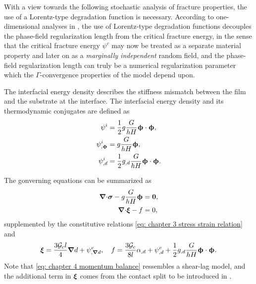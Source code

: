 \begin{remark}
  With a view towards the following stochastic analysis of fracture properties, the use of a Lorentz-type degradation function is necessary. According to one-dimensional analyses in \cite{geelen2019phase,wu2017unified}, the use of Lorentz-type degradation functions decouples the phase-field regularization length from the critical fracture energy, in the sense that the critical fracture energy $\psi^c$ may now be treated as a separate material property and later on as a \emph{marginally independent} random field, and the phase-field regularization length can truly be a numerical regularization parameter which the $\Gamma$-convergence properties of the model depend upon.
\end{remark}

The interfacial energy density describes the stiffness mismatch between the film and the substrate at the interface. The interfacial energy density and its thermodynamic conjugates are defined as
\begin{subequations}
  \begin{align}
    \psi^i                & = \dfrac{1}{2}g\dfrac{G}{hH}\boldsymbol{\upphi}\cdot\boldsymbol{\upphi},      \\
    \psi^i_{,\boldsymbol{\upphi}} & = g\dfrac{G}{hH}\boldsymbol{\upphi},                                  \\
    \psi^i_{,d}           & = \dfrac{1}{2}g_{,d}\dfrac{G}{hH}\boldsymbol{\upphi}\cdot\boldsymbol{\upphi}. 
  \end{align}
\end{subequations}

The gonverning equations can be summarized as
\begin{align}
  {\boldsymbol{\nabla}\cdot} \boldsymbol{\sigma} - g\dfrac{G}{hH}\boldsymbol{\upphi} & = \boldsymbol{0}, \label{eq: chapter 4 momentum balance} \\
  {\boldsymbol{\nabla} \cdot} \boldsymbol{\xi} - f                        & = 0,                                             
\end{align}
supplemented by the constitutive relations \eqref{eq: chapter 3 stress strain relation} and
\begin{align}
  \boldsymbol{\xi} = \dfrac{3{\mathcal{G}_c} l}{4} \boldsymbol{\nabla} d + \psi^e_{,\boldsymbol{\nabla} d}, \quad f = \dfrac{3{\mathcal{G}_c}}{8l}\alpha_{,d} + \psi^e_{,d} + \dfrac{1}{2}g_{,d}\dfrac{G}{hH}\boldsymbol{\upphi}\cdot\boldsymbol{\upphi}.
\end{align}
Note that \eqref{eq: chapter 4 momentum balance} ressembles a shear-lag model, and the additional term in $\boldsymbol{\xi}$ comes from the contact split to be introduced in .

